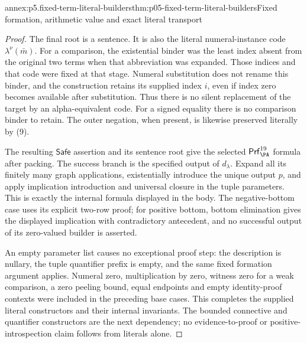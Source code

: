\begin{annexitem}{annex:p5.fixed-term-literal-builders}{thm:p05-fixed-term-literal-builders}{Fixed formation, arithmetic value and exact literal transport}
\begin{proof}
The final root is a sentence. It is also the literal numeral-instance code
\(\lambda^\nu(\bar m)\). For a comparison, the existential binder was
the least index absent from the original two terms when that abbreviation
was expanded. Those indices and that code were fixed at that stage.
Numeral substitution does not rename this binder, and the construction
retains its supplied index \(i\), even if index zero becomes available
after substitution. Thus there is no silent replacement of the target by
an alpha-equivalent code. For a signed equality there is no comparison
binder to retain. The outer negation, when present, is likewise preserved
literally by (9).

The resulting \(\mathsf{Safe}\) assertion and its sentence root give
the selected \(\mathsf{Prf}^{19}_{\PA}\) formula after packing. The
success branch is the specified output of \(d_\lambda\). Expand all
its finitely many graph applications, existentially introduce the unique
output \(p\), and apply implication introduction and universal closure
in the tuple parameters. This is exactly the internal formula displayed
in the body. The negative-bottom case uses its explicit two-row proof;
for positive bottom, bottom elimination gives the displayed implication
with contradictory antecedent, and no successful output of its zero-valued
builder is asserted.

An empty parameter list causes no exceptional proof step: the description
is nullary, the tuple quantifier prefix is empty, and the same fixed
formation argument applies. Numeral zero, multiplication by zero, witness
zero for a weak comparison, a zero peeling bound, equal endpoints and empty
identity-proof contexts were included in the preceding base cases. This
completes the supplied literal constructors and their internal invariants.
The bounded connective and quantifier constructors are the next dependency;
no evidence-to-proof or positive-introspection claim follows from literals
alone.
\end{proof}
\end{annexitem}
